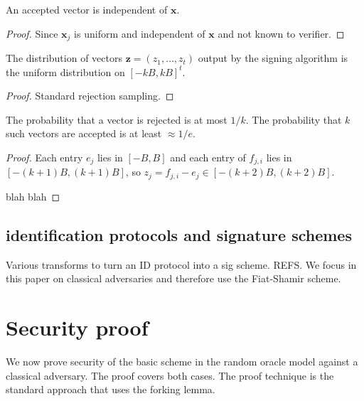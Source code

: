 \documentclass{llncs}
\newcommand{\e}{\textbf{x}}
\newcommand{\f}{\textbf{x}}
\newcommand{\z}{\textbf{z}}
\begin{document}
\begin{lemma}
An accepted vector is independent of $\e$.
\end{lemma}

\begin{proof}
Since $\f_j$ is uniform and independent of $\e$ and not known to verifier.
\end{proof}


\begin{lemma} \label{lem:sim2}
The  distribution of vectors $\z = (z_1, \dots, z_t) $ output by the signing algorithm is the uniform distribution on $[-kB,kB]^t$.
\end{lemma}

\begin{proof}
Standard rejection sampling.
\end{proof}


\begin{lemma}
The probability that a vector is rejected is at most $1/k$.
The probability that $k$ such vectors are accepted is at least $ \approx 1/e$.
\end{lemma}

\begin{proof}
Each entry $e_j$ lies in $[-B,B]$ and each entry of $f_{j,i}$ lies in $[-(k+1)B, (k+1)B]$,
so $z_j = f_{j,i} - e_j \in [-(k+2)B, (k+2)B]$.

blah blah
\end{proof}







\subsection{identification protocols and signature schemes}

Various transforms to turn an ID protocol into a sig scheme.
REFS.
We focus in this paper on classical adversaries and therefore use the Fiat-Shamir scheme.



\section{Security proof}


We now prove security of the basic scheme in the random oracle model against a classical adversary. The proof covers both cases.
The proof technique is the standard approach that uses the forking lemma.
\end{document}
